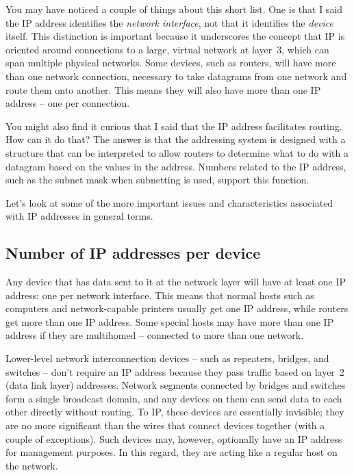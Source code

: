 \documentclass[b5paper,11pt]{memoir}
\begin{document}
You may have noticed a couple of things about this short list.
One is
that I said the IP address identifies the {\emph{network interface}},
not that it identifies the {\emph{device}} itself. This distinction is
important because it underscores the concept that IP is oriented around
connections to a large, virtual network at layer~3, which can span
multiple physical networks. Some devices, such as routers, will have
more than one network connection, necessary to take datagrams from one
network and route them onto another. This means they will also have more
than one IP address -- one per connection.

You might also find it curious that I said that the IP address
facilitates routing. How can it do that? The answer is that the
addressing system is designed with a structure that can be interpreted
to allow routers to determine what to do with a datagram based on the
values in the address. Numbers related to the IP address, such as the
subnet mask when subnetting is used, support this function.

Let's look at some of the more important issues and characteristics
associated with IP addresses in general terms.

\subsection{Number of IP addresses per device}

Any device that has data sent to it at the network layer will have at
least one IP address: one per network interface. This means that normal
hosts such as computers and network-capable printers usually get one IP
address, while routers get more than one IP address. Some special hosts
may have more than one IP address if they are multihomed -- connected to
more than one network.

Lower-level network interconnection devices -- such as repeaters,
bridges, and switches -- don't require an IP address because they pass
traffic based on layer~2 (data link layer) addresses. Network segments
connected by bridges and switches form a single broadcast domain, and
any devices on them can send data to each other directly without
routing. To IP, these devices are essentially invisible; they are no
more significant than the wires that connect devices together (with a
couple of exceptions). Such devices may, however, optionally have an IP
address for management purposes. In this regard, they are acting like a
regular host on the network.
\end{document}
